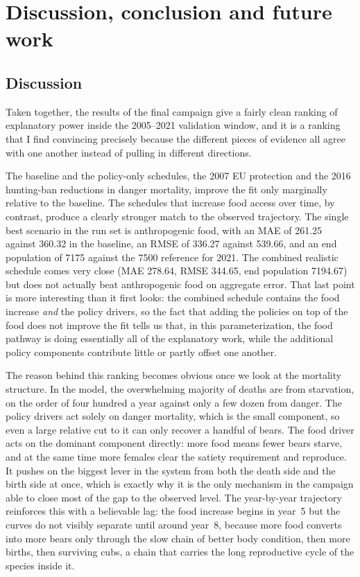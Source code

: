\chapter{Discussion, conclusion and future work}
\label{ch:discussion_conclusion}

\section{Discussion}

Taken together, the results of the final campaign give a fairly clean ranking of explanatory power inside the 2005--2021 validation window, and it is a ranking that I find convincing precisely because the different pieces of evidence all agree with one another instead of pulling in different directions.

The baseline and the policy-only schedules, the 2007 EU protection and the 2016 hunting-ban reductions in danger mortality, improve the fit only marginally relative to the baseline. The schedules that increase food access over time, by contrast, produce a clearly stronger match to the observed trajectory. The single best scenario in the run set is anthropogenic food, with an MAE of 261.25 against 360.32 in the baseline, an RMSE of 336.27 against 539.66, and an end population of 7175 against the 7500 reference for 2021. The combined realistic schedule comes very close (MAE 278.64, RMSE 344.65, end population 7194.67) but does not actually beat anthropogenic food on aggregate error. That last point is more interesting than it first looks: the combined schedule contains the food increase \emph{and} the policy drivers, so the fact that adding the policies on top of the food does not improve the fit tells us that, in this parameterization, the food pathway is doing essentially all of the explanatory work, while the additional policy components contribute little or partly offset one another.

The reason behind this ranking becomes obvious once we look at the mortality structure. In the model, the overwhelming majority of deaths are from starvation, on the order of four hundred a year against only a few dozen from danger. The policy drivers act solely on danger mortality, which is the small component, so even a large relative cut to it can only recover a handful of bears. The food driver acts on the dominant component directly: more food means fewer bears starve, and at the same time more females clear the satiety requirement and reproduce. It pushes on the biggest lever in the system from both the death side and the birth side at once, which is exactly why it is the only mechanism in the campaign able to close most of the gap to the observed level. The year-by-year trajectory reinforces this with a believable lag: the food increase begins in year~5 but the curves do not visibly separate until around year~8, because more food converts into more bears only through the slow chain of better body condition, then more births, then surviving cubs, a chain that carries the long reproductive cycle of the species inside it.

